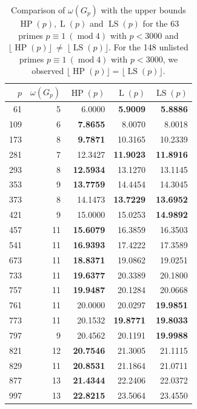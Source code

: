 \documentclass[]{spie}  %
\begin{document}
\begin{table}
\centering
\caption{Comparison of $\omega(G_p)$ with the upper bounds $\operatorname{HP}(p), \operatorname{L}(p)$ and $\operatorname{LS}(p)$ for the 63 primes $p \equiv 1~(\operatorname{mod}4)$ with $p < 3000$ and $\lfloor\operatorname{HP}(p)\rfloor~\neq~\lfloor\operatorname{LS}(p)\rfloor$.  For the 148 unlisted primes $p \equiv 1~(\operatorname{mod}4)$ with $p < 3000$, we observed $\lfloor\operatorname{HP}(p)\rfloor = \lfloor\operatorname{LS}(p)\rfloor$.}
\label{table:p3000}
\vspace{1em}
{\def\arraystretch{1.1}
\begin{tabular}{rrrrr}
\hline
 $p$ & $\omega(G_p)$ & $\operatorname{HP}(p)$ & $\operatorname{L}(p)$ & $\operatorname{LS}(p)$\\
 \hline
61 & 5 & 6.0000 & \textbf{5.9009} & \textbf{5.8886} \\
109 & 6 & \textbf{7.8655} & 8.0070 & 8.0018 \\
173 & 8 & \textbf{9.7871} & 10.3165 & 10.2339 \\
281 & 7 & 12.3427 & \textbf{11.9023} & \textbf{11.8916} \\
293 & 8 & \textbf{12.5934} & 13.1270 & 13.1145 \\
353 & 9 & \textbf{13.7759} & 14.4454 & 14.3045 \\
373 & 8 & 14.1473 & \textbf{13.7229} & \textbf{13.6952} \\
421 & 9 & 15.0000 & 15.0253 & \textbf{14.9892} \\
457 & 11 & \textbf{15.6079} & 16.3859 & 16.3503 \\
541 & 11 & \textbf{16.9393} & 17.4222 & 17.3589 \\
673 & 11 & \textbf{18.8371} & 19.0862 & 19.0251 \\
733 & 11 & \textbf{19.6377} & 20.3389 & 20.1800 \\
757 & 11 & \textbf{19.9487} & 20.1284 & 20.0668 \\
761 & 11 & 20.0000 & 20.0297 & \textbf{19.9851} \\
773 & 11 & 20.1532 & \textbf{19.8771} & \textbf{19.8033} \\
797 & 9 & 20.4562 & 20.1191 & \textbf{19.9988} \\
821 & 12 & \textbf{20.7546} & 21.3005 & 21.1115 \\
829 & 11 & \textbf{20.8531} & 21.1864 & 21.0711 \\
877 & 13 & \textbf{21.4344} & 22.2406 & 22.0372 \\
997 & 13 & \textbf{22.8215} & 23.5064 & 23.4550 \\

\end{tabular}}
\end{table}
\end{document}
